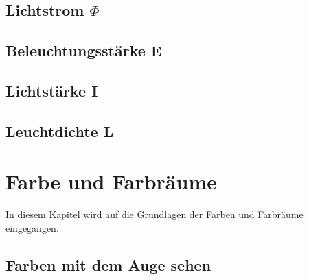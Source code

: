 \section{Lichtstrom $\Phi$} \label{sec_lumen}

\section{Beleuchtungsstärke E}\label{sec_lux}

\section{Lichtstärke I}\label{sec_candela}

\section{Leuchtdichte L}\label{sec_candelamm}

\chapter{Farbe und Farbräume}
In diesem Kapitel wird auf die Grundlagen der Farben und Farbräume eingegangen.

\section{Farben mit dem Auge sehen} \label{sec_auge}

